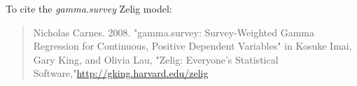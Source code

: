 To cite the \emph{ gamma.survey } Zelig model:
 \begin{verse}
 Nicholas Carnes. 2008. "gamma.survey: Survey-Weighted Gamma Regression for Continuous, Positive Dependent Variables" in Kosuke Imai, Gary King, and Olivia Lau, "Zelig: Everyone's Statistical Software,"\url{http://gking.harvard.edu/zelig} 
\end{verse}